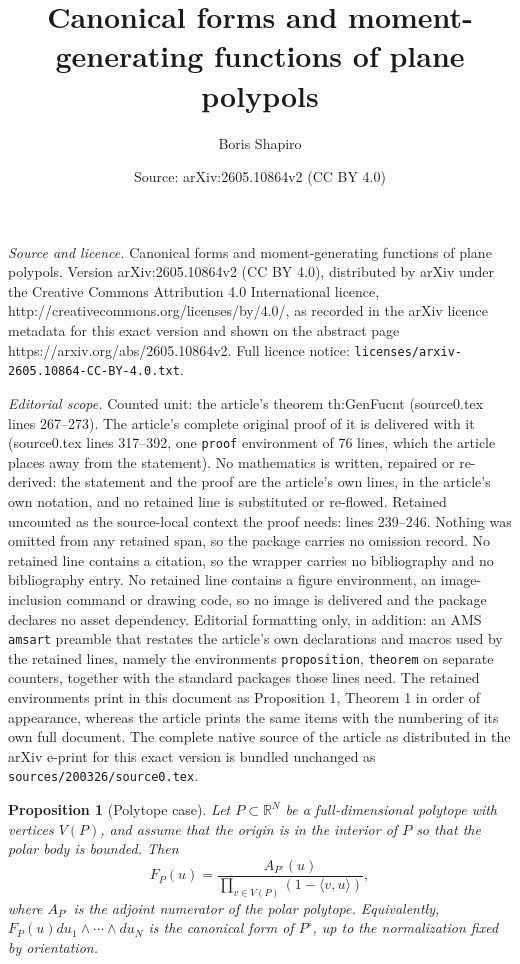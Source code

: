 \documentclass[10pt,a4paper]{amsart}
\title{Canonical forms and moment-generating functions of plane polypols}
\author{Boris Shapiro}
\date{Source: arXiv:2605.10864v2 (CC BY 4.0)}
\newtheorem{proposition}{Proposition}
\newcommand {\bR} {\mathbb R}
\begin{document}
\maketitle

\noindent\emph{Source and licence.} Canonical forms and moment-generating functions of plane polypols. Version arXiv:2605.10864v2 (CC BY 4.0), distributed by arXiv under the Creative Commons Attribution 4.0 International licence, http://creativecommons.org/licenses/by/4.0/, as recorded in the arXiv licence metadata for this exact version and shown on the abstract page https://arxiv.org/abs/2605.10864v2. Full licence notice: \texttt{licenses/arxiv-2605.10864-CC-BY-4.0.txt}.\par\smallskip

\noindent\textit{Editorial scope.} Counted unit: the article's theorem th:GenFucnt (source0.tex lines 267--273). The article's complete original proof of it is delivered with it (source0.tex lines 317--392, one \texttt{proof} environment of 76 lines, which the article places away from the statement). No mathematics is written, repaired or re-derived: the statement and the proof are the article's own lines, in the article's own notation, and no retained line is substituted or re-flowed.  Retained uncounted as the source-local context the proof needs: lines 239--246.  Nothing was omitted from any retained span, so the package carries no omission record.  No retained line contains a citation, so the wrapper carries no bibliography and no bibliography entry.  No retained line contains a figure environment, an image-inclusion command or drawing code, so no image is delivered and the package declares no asset dependency.  Editorial formatting only, in addition: an AMS \texttt{amsart} preamble that restates the article's own declarations and macros used by the retained lines, namely the environments \texttt{proposition}, \texttt{theorem} on separate counters, together with the standard packages those lines need.  The retained environments print in this document as Proposition 1, Theorem 1 in order of appearance, whereas the article prints the same items with the numbering of its own full document.  The complete native source of the article as distributed in the arXiv e-print for this exact version is bundled unchanged as \texttt{sources/200326/source0.tex}.
\begin{proposition}[Polytope case]\label{prop:Poly}
Let $P\subset \bR^N$ be a full-dimensional polytope with vertices $V(P)$, and assume that the origin is in the interior of $P$ so that the polar body is bounded.  Then
$$
F_P(u)=\frac{A_{P^\circ}(u)}{\prod_{v\in V(P)}(1-\langle v,u\rangle)},
$$
where $A_{P^\circ}$ is the adjoint numerator of the polar polytope.  Equivalently,
$F_P(u)du_1\wedge\cdots\wedge du_N$ is the canonical form of $P^\circ$, up to the normalization fixed by orientation.
\end{proposition}
\end{document}
